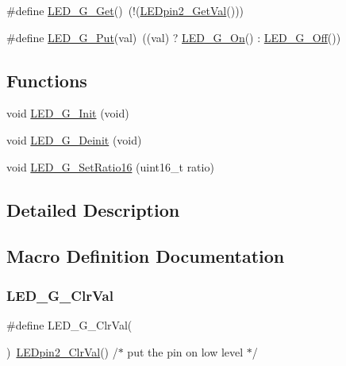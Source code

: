 \begin{DoxyCompactItemize}
\item 
\#define \hyperlink{group___l_e_d___g__module_ga36526a32565ecc2a658213f28805990b}{L\+E\+D\+\_\+\+G\+\_\+\+Get}()~(!(\hyperlink{group___l_e_dpin2__module_ga061f97147af260178617a3fc72624300}{L\+E\+Dpin2\+\_\+\+Get\+Val}()))
\item 
\#define \hyperlink{group___l_e_d___g__module_ga35f6b8fa1277d7f555ee6d83f7b77329}{L\+E\+D\+\_\+\+G\+\_\+\+Put}(val)~((val) ? \hyperlink{group___l_e_d___g__module_gaa2ba3dfac764cceec916eb2e938d1700}{L\+E\+D\+\_\+\+G\+\_\+\+On}() \+: \hyperlink{group___l_e_d___g__module_ga1b82fa7a2e6460f0797f8cf1e3495af5}{L\+E\+D\+\_\+\+G\+\_\+\+Off}())
\end{DoxyCompactItemize}
\subsection*{Functions}
\begin{DoxyCompactItemize}
\item 
void \hyperlink{group___l_e_d___g__module_ga4f455fe170e1716cda4352d8d66aa85a}{L\+E\+D\+\_\+\+G\+\_\+\+Init} (void)
\item 
void \hyperlink{group___l_e_d___g__module_ga166e0bcc7d850029ce9a4c1ebdf18213}{L\+E\+D\+\_\+\+G\+\_\+\+Deinit} (void)
\item 
void \hyperlink{group___l_e_d___g__module_ga588b5552034684221f7c2b3fc1e04b24}{L\+E\+D\+\_\+\+G\+\_\+\+Set\+Ratio16} (uint16\+\_\+t ratio)
\end{DoxyCompactItemize}


\subsection{Detailed Description}


\subsection{Macro Definition Documentation}
\mbox{\label{group___l_e_d___g__module_gaa2597e865b6615b8155dbda3d854e48a}} 
\subsubsection{\texorpdfstring{L\+E\+D\+\_\+\+G\+\_\+\+Clr\+Val}{LED\_G\_ClrVal}}
{\footnotesize\ttfamily \#define L\+E\+D\+\_\+\+G\+\_\+\+Clr\+Val(\begin{DoxyParamCaption}{ }\end{DoxyParamCaption})~\hyperlink{group___l_e_dpin2__module_gaa47cab827e06b75f94eb46069f91515d}{L\+E\+Dpin2\+\_\+\+Clr\+Val}() /$\ast$ put the pin on low level $\ast$/}

